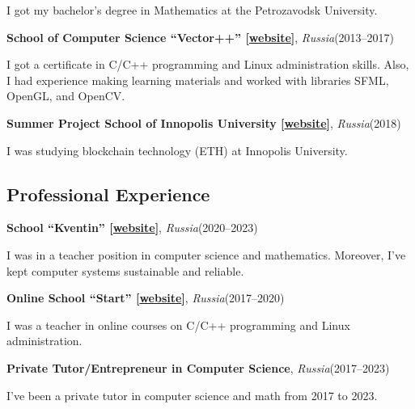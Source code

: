 \documentclass[11pt]{article}
\begin{document}
I got my bachelor's degree in Mathematics at the Petrozavodsk University.

\vspace{2mm}
\noindent\textbf{School of Computer Science ``Vector++'' [\href{https://www.vector-plus-plus.ru}{website}]}, \textit{Russia}\hfill(2013--2017)

I got a certificate in C/C++ programming and Linux administration skills. Also, I had experience making learning materials and worked with libraries SFML, OpenGL, and OpenCV.

\vspace{2mm}
\noindent\textbf{Summer Project School of Innopolis University [\href{https://team-project.university.innopolis.ru/projectschool2018}{website}]}, \textit{Russia}\hfill(2018) 

I was studying blockchain technology (ETH) at Innopolis University. 

\subsection*{Professional Experience}

\vspace{2mm}
\noindent\textbf{School ``Kventin'' [\href{https://kventinptz.ru}{website}]}, \textit{Russia}\hfill(2020--2023)

I was in a teacher position in computer science and mathematics. Moreover, I've kept computer systems sustainable and reliable.

\vspace{2mm}
\noindent\textbf{Online School ``Start'' [\href{http://schoolprogstart.tilda.ws}{website}]}, \textit{Russia}\hfill(2017--2020)

I was a teacher in online courses on C/C++ programming and Linux administration. 

\vspace{2mm}
\noindent\textbf{Private Tutor/Entrepreneur in Computer Science}, \textit{Russia}\hfill(2017--2023)

I've been a private tutor in computer science and math from 2017 to 2023.


\nocite{*}
\printbibliography[heading={subbibliography},title={Journal Articles},type=article]

\printbibliography[heading={subbibliography},title={Conference Proceedings},type=inproceedings]
\end{document}
